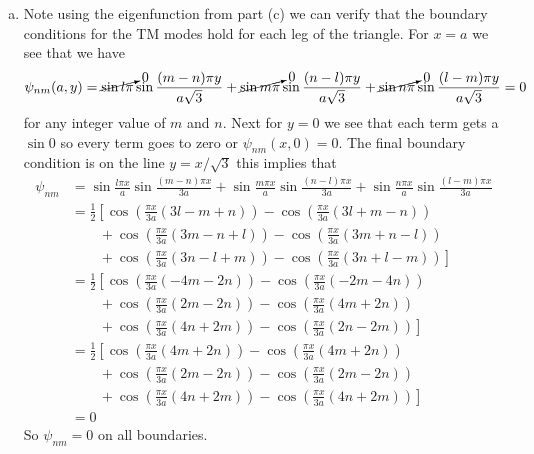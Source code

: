 \documentclass[11pt]{article}
\numberwithin{equation}{section}
\begin{document}
\begin{enumerate}[(a)]
\item
    Note using the eigenfunction from part (c) we can verify that the boundary conditions for the TM modes hold for
    each leg of the triangle. For $x=a$ we see that we have
    $$\psi_{nm}(a,y) = \cancelto{0}{\sin{l\pi}}\sin\frac{(m-n)\pi{y}}{a\sqrt{3}}
    + \cancelto{0}{\sin{m\pi}}\sin\frac{(n-l)\pi{y}}{a\sqrt{3}}
    + \cancelto{0}{\sin{n\pi}}\sin\frac{(l-m)\pi{y}}{a\sqrt{3}} = 0$$
    for any integer value of $m$ and $n$. Next for $y = 0$ we see that each term gets a $\sin{0}$ so every term goes
    to zero or $\psi_{nm}(x,0) = 0$. The final boundary condition is on the line $y = x/\sqrt{3}$ this implies that
    \begin{align*}
        \psi_{nm} &= \sin\frac{l\pi{x}}{a}\sin\frac{(m-n)\pi{x}}{3a}
            + \sin\frac{m\pi{x}}{a}\sin\frac{(n-l)\pi{x}}{3a}
            + \sin\frac{n\pi{x}}{a}\sin\frac{(l-m)\pi{x}}{3a}\\
        &= \frac{1}{2}\left[\cos\left(\frac{\pi{x}}{3a}(3l-m+n)\right) - \cos\left(\frac{\pi{x}}{3a}(3l+m-n)\right)\right.\\
        &\qquad+\cos\left(\frac{\pi{x}}{3a}(3m-n+l)\right) - \cos\left(\frac{\pi{x}}{3a}(3m+n-l)\right)\\
        &\qquad+\left.\cos\left(\frac{\pi{x}}{3a}(3n-l+m)\right) - \cos\left(\frac{\pi{x}}{3a}(3n+l-m)\right)\right]\\
        &= \frac{1}{2}\left[\cos\left(\frac{\pi{x}}{3a}(-4m-2n)\right) - \cos\left(\frac{\pi{x}}{3a}(-2m-4n)\right)\right.\\
        &\qquad+\cos\left(\frac{\pi{x}}{3a}(2m-2n)\right) - \cos\left(\frac{\pi{x}}{3a}(4m+2n)\right)\\
        &\qquad+\left.\cos\left(\frac{\pi{x}}{3a}(4n+2m)\right) - \cos\left(\frac{\pi{x}}{3a}(2n-2m)\right)\right]\\
        &= \frac{1}{2}\left[\cos\left(\frac{\pi{x}}{3a}(4m+2n)\right) - \cos\left(\frac{\pi{x}}{3a}(4m+2n)\right)\right.\\
        &\qquad+\cos\left(\frac{\pi{x}}{3a}(2m-2n)\right) - \cos\left(\frac{\pi{x}}{3a}(2m-2n)\right)\\
        &\qquad+\left.\cos\left(\frac{\pi{x}}{3a}(4n+2m)\right) - \cos\left(\frac{\pi{x}}{3a}(4n+2m)\right)\right]\\
        &= 0
    \end{align*}
    So $\psi_{nm}=0$ on all boundaries.
    



\end{enumerate}
\end{document}
